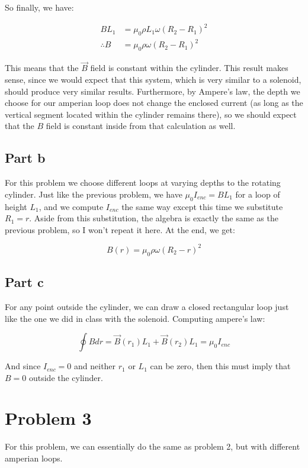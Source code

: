 \documentclass{article}
\theoremstyle{definition}
\numberwithin{equation}{section}
\numberwithin{definition}{section}
\begin{document}
So finally, we have: 

\begin{align*}
  BL_1 &= \mu_0 \rho L_1 \omega (R_2 - R_1)^2\\
  \therefore B &= \mu_0 \rho \omega(R_2 - R_1)^2 
\end{align*}

This means that the $\vec{B}$ field is constant within the cylinder. This result makes sense, since we would expect that this system, which is very similar to a solenoid, should produce very similar results. Furthermore, by Ampere's law, the depth we choose for our amperian loop does not change the enclosed current (as long as the vertical segment located within the cylinder remains there), so we should expect that the $B$ field is constant inside from that calculation as well.


\subsection{Part b}

For this problem we choose different loops at varying depths to the rotating cylinder. Just like the previous problem, we have $\mu_0 I_{enc} = BL_1$ for a loop of height $L_1$, and we compute $I_{enc}$ the same way except this time we substitute $R_1 = r$. Aside from this substitution, the algebra is exactly the same as the previous problem, so I won't repeat it here. At the end, we get:

\[ B(r) = \mu_0 \rho \omega (R_2 - r)^2 \]

\subsection{Part c}

For any point outside the cylinder, we can draw a closed rectangular loop just like the one we did in class with the solenoid. Computing ampere's law:

\[ \oint B dr = \vec{B}(r_1)L_1 + \vec{B}(r_2)L_1 = \mu_0 I_{enc}\]

And since $I_{enc} = 0$ and neither $r_1$ or $L_1$ can be zero, then this must imply that $\boxed{B = 0}$ outside the cylinder.

\section{Problem 3}

For this problem, we can essentially do the same as problem 2, but with different amperian loops.
\end{document}
